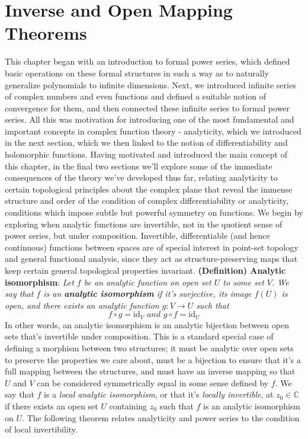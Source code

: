 \documentclass{article}
\newcommand*{\tb}{\textbf}
\newcommand*{\ti}{\textit}
\newcommand*{\nn}{\newline \newline}
\newcommand*{\C}{\mathbb{C}}
\begin{document}
\section{Inverse and Open Mapping Theorems}
This chapter began with an introduction to formal power series, which defined basic operations on these formal structures in such a way as to naturally generalize polynomials to infinite dimensions. Next, we introduced infinite series of complex numbers and even functions and defined a suitable notion of convergence for them, and then connected these infinite series to formal power series. All this was motivation for introducing one of the most fundamental and important concepts in complex function theory - analyticity, which we introduced in the next section, which we then linked to the notion of differentiability and holomorphic functions. Having motivated and introduced the main concept of this chapter, in the final two sections we'll explore some of the immediate consequences of the theory we've developed thus far, relating analyticity to certain topological principles about the complex plane that reveal the immense structure and order of the condition of complex differentiability or analyticity, conditions which impose subtle but powerful symmetry on functions.
\nn
We begin by exploring when analytic functions are invertible, not in the quotient sense of power series, but under composition. Invertible, differentiable (and hence continuous) functions between spaces are of special interest in point-set topology and general functional analysis, since they act as structure-preserving maps that keep certain general topological properties invariant.
\nn
\tb{(Definition) Analytic isomorphism}: \ti{Let $ f $ be an analytic function on open set $ U $ to some set $ V $. We say that $ f $ is an \tb{analytic isomorphism} if it's surjective, its image $ f(U) $ is open, and there exists an analytic function $ g: V \rightarrow U $ such that}
    $$ f \circ g = \text{id}_V \ti{ and } g \circ f = \text{id}_U $$
In other words, an analytic isomorphism is an analytic bijection between open sets that's invertible under composition. This is a standard special case of defining a morphism between two structures; it must be analytic over open sets to preserve the properties we care about, must be a bijection to ensure that it's a full mapping between the structures, and must have an inverse mapping so that $ U $ and $ V $ can be considered symmetrically equal in some sense defined by $ f $. We say that $ f $ is a \ti{local analytic isomorphism}, or that it's \ti{locally invertible}, at $ z_0 \in \C $ if there exists an open set $ U $ containing $ z_0 $ such that $ f $ is an analytic isomorphism on $ U $. The following theorem relates analyticity and power series to the condition of local invertibility.
\end{document}
